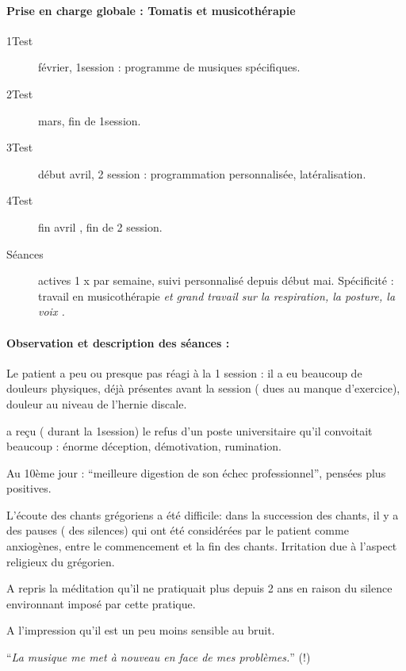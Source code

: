 \documentclass[12pt,french]{report}
\begin{document}
\paragraph{Prise en charge globale : Tomatis et musicothérapie}
\begin{description}
\item [{1\textdegree Test}] février, 1\textdegree session : programme de
musiques spécifiques.
\item [{2\textdegree Test}] mars, fin de 1\textdegree session. 
\item [{3\textdegree Test}] début avril, 2\textdegree{} session : programmation
personnalisée, latéralisation.
\item [{4\textdegree Test}] fin avril , fin de 2\textdegree{} session.
\item [{Séances}] actives 1 x par semaine, suivi personnalisé depuis début
mai.\emph{ }Spécificité : travail en musicothérapie\emph{ et grand
travail sur la respiration, la posture, la voix .}
\end{description}

\paragraph{Observation et description des séances :}

Le patient a peu ou presque pas réagi à la 1\textdegree{} session
: il a eu beaucoup de douleurs physiques, déjà présentes avant la
session ( dues au manque d'exercice), douleur au niveau de l'hernie
discale.

a reçu ( durant la 1\textdegree session) le refus d'un poste universitaire
qu'il convoitait beaucoup : énorme déception, démotivation, rumination.

Au 10ème jour : ``meilleure digestion de son échec professionnel'',
pensées plus positives.

L'écoute des chants grégoriens a été difficile: dans la succession
des chants, il y a des pauses ( des silences) qui ont été considérées
par le patient comme anxiogènes, entre le commencement et la fin des
chants. Irritation due à l'aspect religieux du grégorien.

A repris la méditation qu'il ne pratiquait plus depuis 2 ans en raison
du silence environnant imposé par cette pratique.

A l'impression qu'il est un peu moins sensible au bruit.

``\emph{La musique me met à nouveau en face de mes problèmes.}''
(!)
\end{document}

